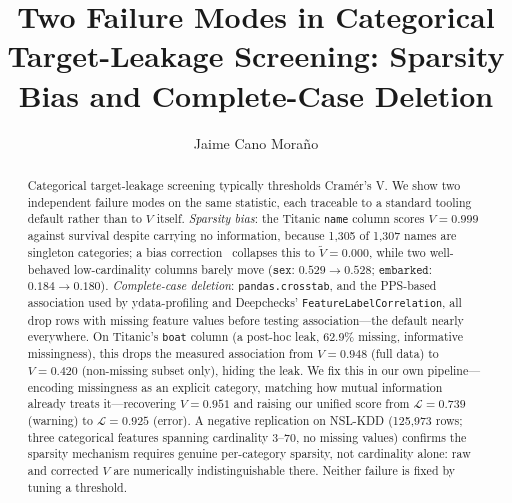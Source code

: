 \documentclass[sigconf,anonymous=false]{acmart}
\begin{document}
\title{Two Failure Modes in Categorical Target-Leakage Screening: Sparsity Bias and Complete-Case Deletion}

\author{Jaime Cano Mora\~{n}o}

\renewcommand{\shortauthors}{Cano Mora\~{n}o}

\begin{abstract}
Categorical target-leakage screening typically thresholds Cram\'er's V.
We show two independent failure modes on the same statistic, each traceable
to a standard tooling default rather than to $V$ itself.
\emph{Sparsity bias}: the Titanic \texttt{name} column scores $V=0.999$
against survival despite carrying no information, because 1{,}305 of
1{,}307 names are singleton categories; a bias
correction~\cite{bergsma2013bias} collapses this to $\widetilde{V}=0.000$,
while two well-behaved low-cardinality columns barely move
($\texttt{sex}$: $0.529{\to}0.528$; $\texttt{embarked}$: $0.184{\to}0.180$).
\emph{Complete-case deletion}: \texttt{pandas.crosstab}, and the PPS-based
association used by ydata-profiling and Deepchecks'
\texttt{Feature\-Label\-Correlation}, all drop rows with missing feature values
before testing association---the default nearly everywhere. On Titanic's
\texttt{boat} column (a post-hoc leak, 62.9\% missing, informative
missingness), this drops the measured association from $V=0.948$ (full
data) to $V=0.420$ (non-missing subset only), hiding the leak. We fix this
in our own pipeline---encoding missingness as an explicit category, matching
how mutual information already treats it---recovering $V=0.951$ and raising
our unified score from $\mathcal{L}=0.739$ (warning) to $\mathcal{L}=0.925$
(error). A negative replication on NSL-KDD (125{,}973 rows; three
categorical features spanning cardinality 3--70, no missing values)
confirms the sparsity mechanism requires genuine per-category sparsity, not
cardinality alone: raw and corrected $V$ are numerically indistinguishable
there. Neither failure is fixed by tuning a threshold.
\end{abstract}


\end{document}
